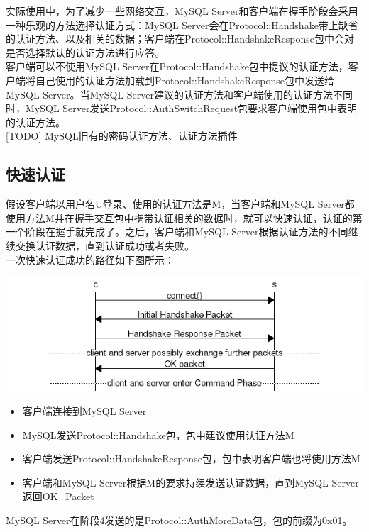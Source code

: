\documentclass[a4paper, titlepage, 10pt, bookmark]{article}
\begin{document}
实际使用中，为了减少一些网络交互，MySQL Server和客户端在握手阶段会采用一种乐观的方法选择认证方式：MySQL Server会在Protocol::Handshake带上缺省的认证方法、以及相关的数据；客户端在Protocol::HandshakeResponse包中会对是否选择默认的认证方法进行应答。\\

客户端可以不使用MySQL Server在Protocol::Handshake包中提议的认证方法，客户端将自己使用的认证方法加载到Protocol::HandshakeResponse包中发送给MySQL Server。当MySQL Server建议的认证方法和客户端使用的认证方法不同时，MySQL Server发送Protocol::AuthSwitchRequest包要求客户端使用包中表明的认证方法。\\

[TODO] MySQL旧有的密码认证方法、认证方法插件



\subsection{快速认证}
假设客户端以用户名U登录、使用的认证方法是M，当客户端和MySQL Server都使用方法M并在握手交互包中携带认证相关的数据时，就可以快速认证，认证的第一个阶段在握手就完成了。之后，客户端和MySQL Server根据认证方法的不同继续交换认证数据，直到认证成功或者失败。\\

一次快速认证成功的路径如下图所示：
\begin{center}
\includegraphics[width=6in]{005.png}
\end{center}

\begin{itemize}
    \item 客户端连接到MySQL Server
    \item MySQL发送Protocol::Handshake包，包中建议使用认证方法M
    \item 客户端发送Protocol::HandshakeResponse包，包中表明客户端也将使用方法M
    \item 客户端和MySQL Server根据M的要求持续发送认证数据，直到MySQL Server返回OK\_Packet
\end{itemize}

MySQL Server在阶段4发送的是Protocol::AuthMoreData包，包的前缀为0x01。\\
\end{document}
